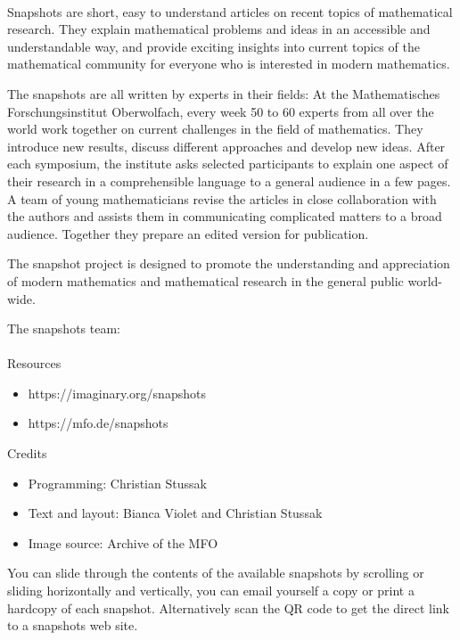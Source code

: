 \documentclass[10pt]{article}
\begin{document}
%
\pagecolor{black}%
\color{white}%
%
{\centering%
    \sffamily%
    \\[0.2cm]
}
\vfill

\noindent Snapshots are short, easy to understand articles on recent topics of mathematical research. They explain mathematical problems and ideas in an accessible and understandable way, and provide exciting insights into current topics of the mathematical community for everyone who is interested in modern mathematics.

The snapshots are all written by experts in their fields: At the Mathematisches Forschungsinstitut Oberwolfach, every week 50 to 60 experts from all over the world work together on current challenges in the field of mathematics. They introduce new results, discuss different approaches and develop new ideas. After each symposium, the institute asks selected participants to explain one aspect of their research in a comprehensible language to a general audience in a few pages. A team of young mathematicians revise the articles in close collaboration with the authors and assists them in communicating complicated matters to a broad audience. Together they prepare an edited version for publication.

The snapshot project is designed to promote the understanding and appreciation of modern mathematics and mathematical research in the general public world-wide.
\vfill

\noindent The snapshots team:\\[0.2ex]
\\[-1ex]
%
\noindent Resources
\begin{itemize}
    \item https://imaginary.org/snapshots
    \item https://mfo.de/snapshots
\end{itemize}
\bigskip
\bigskip

\noindent Credits
\begin{itemize}
    \item Programming: Christian Stussak
    \item Text and layout: Bianca Violet and Christian Stussak
    \item Image source: Archive of the MFO
\end{itemize}
\bigskip
\bigskip

\noindent You can slide through the contents of the available snapshots by scrolling or sliding horizontally and vertically, you can email yourself a copy or print a hardcopy of each snapshot. Alternatively scan the QR code to get the direct link to a snapshots web site.
\end{document}
